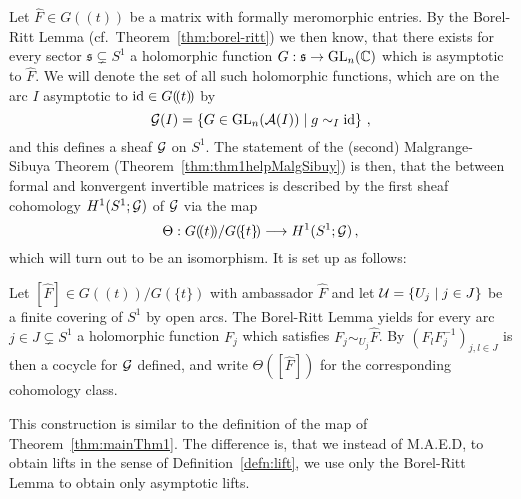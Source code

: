 Let $\hat F\in G(\!(t)\!)$ be a matrix with formally meromorphic entries. By
the Borel-Ritt Lemma (cf.\ Theorem~\ref{thm:borel-ritt}) we then know, that
there exists for every sector $\mathfrak{s}\subsetneq S^1$ a holomorphic
function $G:\mathfrak{s}\to\operatorname{GL}_n(\mathbb{C})$ which is asymptotic to $\hat F$.
We will denote the set of all such holomorphic functions, which are on
the arc $I$ asymptotic to $\operatorname{id}\in G(\!(t)\!)$ by
\[
  \mathcal{G}(I)=\left\{G\in\operatorname{GL}_n(\mathcal{A}(I))\mid g\sim_I\operatorname{id}\right\}\,,
\]
and this defines a sheaf $\mathcal{G}$ on $S^1$.
The statement of the (second) Malgrange-Sibuya Theorem
(Theorem~\ref{thm:thm1helpMalgSibuy}) is then, that the 
between formal and konvergent invertible matrices is described by the first
sheaf cohomology $H^1(S^1;\mathcal{G})$ of $\mathcal{G}$ via the map
\[
  \Theta: G(\!(t)\!)/G(\!\{t\}\!)\longrightarrow H^1(S^1;\mathcal{G}) \,,
\]
which will turn out to be an isomorphism. It is set up as follows:
\begin{einr}
  Let $[\hat F]\in G(\!(t)\!)/G(\!\{t\}\!)$ with ambassador $\hat F$ and
  let $\mathcal{U}=\{U_j\mid j\in J\}$ be a finite covering of $S^1$ by open arcs.
  The Borel-Ritt Lemma yields for every arc $j\in J\subsetneq S^1$ a
  holomorphic function $F_j$ which satisfies $F_j\sim_{U_j}\hat F$.
  By $(F_lF_j^{-1})_{j,l\in J}$ is then a cocycle for $\mathcal{G}$ defined,
  and write $\Theta([\hat F])$ for the corresponding cohomology class.
\end{einr}
This construction is similar to the definition of the map of
Theorem~\ref{thm:mainThm1}. The difference is, that we instead of M.A.E.D, to
obtain lifts in the sense of Definition~\ref{defn:lift}, we use only the
Borel-Ritt Lemma to obtain only asymptotic lifts.

